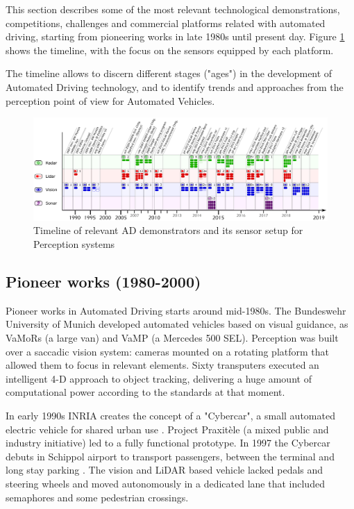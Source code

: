 This section describes some of the most relevant technological demonstrations, competitions, challenges and commercial platforms related with automated driving, starting from pioneering works in late 1980s until present day. Figure \ref{fig:tech-demos} shows the timeline, with the focus on the sensors equipped by each platform.

The timeline allows to discern different stages ("ages") in the development of Automated Driving technology, and to identify trends and approaches from the perception point of view for Automated Vehicles.

\begin{figure}[p] %
  \includegraphics[width=0.95\textheight,angle=90,keepaspectratio]{"img/AD_demos_Timeline"}
  \caption{Timeline of relevant AD demonstrators and its sensor setup for 
      Perception systems}
  \label{fig:tech-demos}
\end{figure}

\subsection{Pioneer works (1980-2000)}

Pioneer works in Automated Driving starts around mid-1980s. The Bundeswehr 
University of Munich developed automated vehicles based on visual guidance, as 
VaMoRs \cite{Dickmanns1987} (a large van) and VaMP \cite{Gregor2002} (a 
Mercedes 500 SEL). Perception was built over a saccadic vision 
system: cameras mounted on a rotating platform that allowed them to focus in
relevant elements. Sixty transputers executed an intelligent 4-D approach to
object tracking, delivering a huge amount of computational power according to
the standards at that moment.

In early 1990s INRIA creates the concept of a "Cybercar", a small automated 
electric vehicle for shared urban use \cite{Parent1993}. Project Praxitèle
\cite{Massot1999} (a mixed public and industry initiative) led to a fully
functional prototype. In 1997 the Cybercar debuts in Schippol airport to
transport passengers, between the terminal and long stay parking 
\cite{Ozguner2007}. The vision and LiDAR based vehicle lacked pedals and 
steering wheels and moved autonomously in a dedicated lane that included 
semaphores and some pedestrian crossings.

